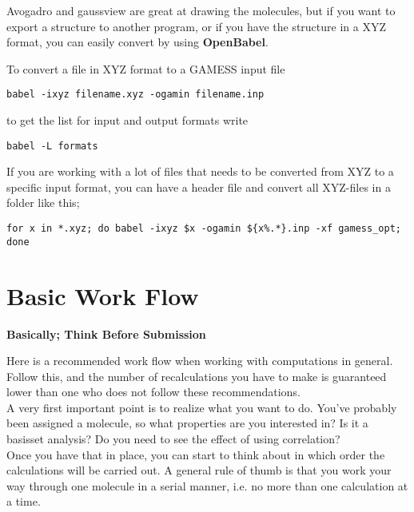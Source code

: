 \documentclass{article}
\begin{document}
Avogadro and gaussview are great at drawing the molecules, but if you want to export a structure to another program, or if you have the structure in a XYZ format, you can easily convert by using {\bf OpenBabel}.

To convert a file in XYZ format to a GAMESS input file
\begin{lstlisting}
babel -ixyz filename.xyz -ogamin filename.inp
\end{lstlisting}

to get the list for input and output formats write

\begin{lstlisting}
babel -L formats
\end{lstlisting}

If you are working with a lot of files that needs to be converted from XYZ to a specific input format, you can have a header file  and convert all XYZ-files in a folder like this;

\begin{lstlisting}
for x in *.xyz; do babel -ixyz $x -ogamin ${x%.*}.inp -xf gamess_opt; done
\end{lstlisting}

\newpage
\section{Basic Work Flow}

\begin{center}
\bf Basically; Think Before Submission
\end{center}



Here is a recommended work flow when working with computations in general.
Follow this, and the number of recalculations you have to make is guaranteed lower than one who does not follow these recommendations.\\

A very first important point is to realize what you want to do.
You've probably been assigned a molecule, so what properties are you interested in?
Is it a basisset analysis?
Do you need to see the effect of using correlation?\\

Once you have that in place, you can start to think about in which order the calculations will be carried out.
A general rule of thumb is that you work your way through one molecule in a serial manner, i.e. no more than one calculation at a time.\\
\end{document}
